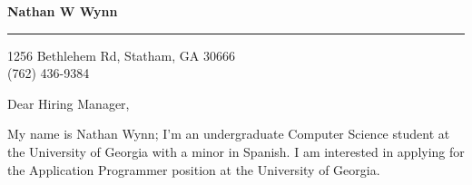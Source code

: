 \documentclass{letter} %
\begin{document}
\signature{Nathan W Wynn}           %
\longindentation=0pt                       %
\let\raggedleft\raggedright                %
 
 
\begin{letter}%


\begin{flushleft}
{\large\bf Nathan W Wynn}
\end{flushleft}
\medskip\hrule height 1pt
\begin{flushright}
\hfill 1256 Bethlehem Rd, Statham, GA 30666 \\
\hfill (762) 436-9384
\end{flushright} 
\vfill %

 
\opening{Dear Hiring Manager,} 
 
\noindent My name is Nathan Wynn; I'm an undergraduate Computer Science student at the University of Georgia with a minor in Spanish. I am interested in applying for the Application Programmer position at the University of Georgia.
 

\end{letter}
\end{document}
